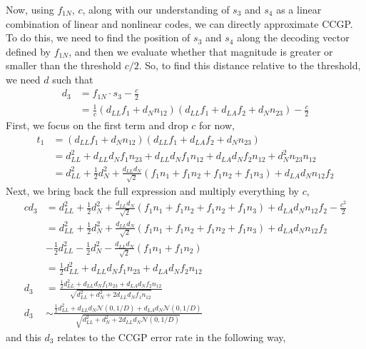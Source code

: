 \documentclass[letter,12pt]{article}
\newcommand{\dll}{d_{LL}}
\newcommand{\dla}{d_{LA}}
\newcommand{\dn}{d_{N}}
\newcommand{\dis}{\mathcal{N}(0, 1/D)}
\begin{document}
Now, using $f_{1N}$, $c$, along with our understanding of $s_{3}$ and $s_{4}$
as a linear combination of linear and nonlinear codes, we can directly
approximate CCGP. To do this, we need to find the position
of $s_{3}$ and $s_{4}$ along the decoding vector defined by $f_{1N}$, and then
we evaluate whether that magnitude is greater or smaller than the threshold
$c/2$. So, to find this distance relative to the threshold, we need $d$ such
that
\begin{align}
  d_{3} &= f_{1N} \cdot s_{3} - \frac{c}{2} \\
  &= \frac{1}{c}\left(\dll f_{1} + \dn n_{12}\right)
  \left(\dll f_{1} + \dla f_{2} + \dn n_{23}\right) - \frac{c}{2} 
\end{align}
First, we focus on the first term and drop $c$ for now,
\begin{align}
  t_{1} &= \left(\dll f_{1} + \dn n_{12}\right)
  \left(\dll f_{1} + \dla f_{2} + \dn n_{23}\right) \\
  &= \dll^{2} + \dll \dn f_{1} n_{23} + \dll \dn f_{1} n_{12}
  + \dla \dn f_{2} n_{12} + \dn^{2} n_{23} n_{12} \\
  &= \dll^{2} + \frac{1}{2}\dn^{2}
  + \frac{\dll \dn}{\sqrt{2}}\left(f_{1}n_{1} + f_{1}n_{2}
  + f_{1}n_{2} + f_{1}n_{3}\right) + \dla \dn n_{12}f_{2} 
\end{align}
Next, we bring back the full expression and multiply everything by $c$,
\begin{align}
  c d_{3} &= \dll^{2} + \frac{1}{2}\dn^{2}
  + \frac{\dll \dn}{\sqrt{2}}\left(f_{1}n_{1} + f_{1}n_{2}
  + f_{1}n_{2} + f_{1}n_{3}\right) + \dla \dn n_{12}f_{2}
  - \frac{c^{2}}{2} \\
  &= \dll^{2} + \frac{1}{2}\dn^{2}
  + \frac{\dll \dn}{\sqrt{2}}\left(f_{1}n_{1} + f_{1}n_{2}
  + f_{1}n_{2} + f_{1}n_{3}\right) + \dla \dn n_{12}f_{2}
  \\ &- \frac{1}{2}\dll^{2} - \frac{1}{2} \dn^{2}
  - \frac{\dll\dn}{\sqrt{2}}\left(f_{1}n_{1} + f_{1}n_{2}\right) \\
  &= \frac{1}{2}\dll^{2} + \dll\dn f_{1}n_{23} + \dla\dn f_{2}n_{12} \\
  d_{3} &= \frac{\frac{1}{2}\dll^{2} + \dll\dn f_{1}n_{23} + \dla\dn f_{2}n_{12}}
  {\sqrt{\dll^{2} + \dn^{2} + 2 \dll \dn f_{1}n_{12}}} \\
  d_{3} &\sim \frac{\frac{1}{2}\dll^{2} + \dll\dn \dis + \dla\dn \dis}
  {\sqrt{\dll^{2} + \dn^{2} + 2 \dll \dn \dis}}
\end{align}
and this $d_{3}$ relates to the CCGP error rate in the following way,
\end{document}
